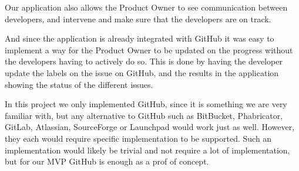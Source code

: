 Our application also allows the Product Owner to see communication between developers, and intervene and make sure that the developers are on track.

And since the application is already integrated with GitHub it was easy to implement a way for the Product Owner to be updated on the progress without the developers having to actively do so.
This is done by having the developer update the labels on the issue on GitHub, and the results in the application showing the status of the different issues. 

In this project we only implemented GitHub, since it is something we are very familiar with, but any alternative to GitHub such as BitBucket, Phabricator, GitLab, Atlassian, SourceForge or Launchpad would work just as well. However, they each would require specific implementation to be supported.
Such an implementation would likely be trivial and not require a lot of implementation, but for our MVP GitHub is enough as a prof of concept.
